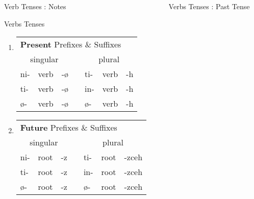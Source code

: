 \documentclass[12pt]{beamer}
\newcommand{\nah}[1]{\textcolor{nahgrn}{#1}}
\newcommand{\trs}[1]{\textcolor{nahblu}{#1}}
\begin{document}
\begin{frame}
\begin{columns}[t]
\begin{column}{.23\linewidth}
\begin{block}{Verb Tenses : Notes}
    		
    	\end{block}
    	\begin{block}{Verbs Tenses}
    		\begin{enumerate}
    			\item \begin{tabular}[t]{lllllll}
    				\multicolumn{7}{l}{\textbf{Present} \nah{Prefixes} \& \trs{Suffixes}}              \\
    				\multicolumn{3}{c}{singular}    & \vline & \multicolumn{3}{c}{plural}     \\
    				\cline{1-7}
    				\nah{ni-}   & verb & \trs{-ø}   & \vline & \nah{ti-}   & verb & \trs{-h}  \\
    				\nah{ti-}   & verb & \trs{-ø}   & \vline & \nah{in-}   & verb & \trs{-h}  \\
    				\nah{ø-}    & verb & \trs{-ø}   & \vline & \nah{ø-}    & verb & \trs{-h}  \\
    			\end{tabular}%
    			\item \begin{tabular}[t]{lllllll}
    				\multicolumn{7}{l}{\textbf{Future} \nah{Prefixes} \& \trs{Suffixes}}       	         \\
    				\multicolumn{3}{c}{singular}    & \vline & \multicolumn{3}{c}{plural}        \\
    				\cline{1-7}
    				\nah{ni-}   & root & \trs{-z}   & \vline & \nah{ti-}   & root & \trs{-zceh}  \\
    				\nah{ti-}   & root & \trs{-z}   & \vline & \nah{in-}   & root & \trs{-zceh}  \\
    				\nah{ø-}    & root & \trs{-z}   & \vline & \nah{ø-}    & root & \trs{-zceh}  \\
    			\end{tabular}%
    		\end{enumerate}
    	\end{block}
    	
    \end{column}

    \begin{column}{.26\linewidth}
    	\begin{block}{Verbs Tenses : Past Tense}
    		
    		\begin{enumerate}
    			

\end{enumerate}
\end{block}
\end{column}
\end{columns}
\end{frame}
\end{document}
